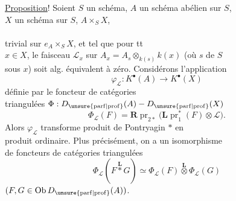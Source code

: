 \uline{Proposition}! Soient $S$ un schéma, $A$ un schéma abélien sur $S$,\\
$X$ un schéma sur $S$,   $A\times_S X$,\\
\\
trivial sur $e_A\times_S X$, et tel que  pour tt\\
$x\in X$, le faisceau $\mathcal L_x$ sur $A_x=A_s\otimes_{k(s)}k(x)$ (où $s$  de $S$\\
sous $x$) soit alg. équivalent à zéro. Considérons l'application
\[
\varphi_{\mathcal L}:K^\bullet(A)\longrightarrow K^\bullet(X)
\]
définie par  le foncteur de catégories\\
triangulées $\Phi:D_{\unsure{\mathrm{parf}|\mathrm{prof}}}(A)\mathbin{-}D_{\unsure{\mathrm{parf}|\mathrm{prof}}}(X)$
\[
\Phi_{\mathcal L}(F)=\mathbf R\operatorname{pr}_{2*}\bigl(\mathbf L\operatorname{pr}_1^*(F)\otimes\mathcal L\bigr).
\]
Alors $\varphi_{\mathcal L}$ transforme produit de Pontryagin $*$ en\\
produit ordinaire. Plus précisément, on a un isomorphisme\\
de foncteurs de catégories triangulées
\[
\Phi_{\mathcal L}(F\overset{\mathbf L}{*}G)\simeq
\Phi_{\mathcal L}(F)\overset{\mathbf L}{\otimes}\Phi_{\mathcal L}(G)
\]
$(F,G\in\operatorname{Ob}D_{\unsure{\mathrm{parf}|\mathrm{prof}}}(A))$.

